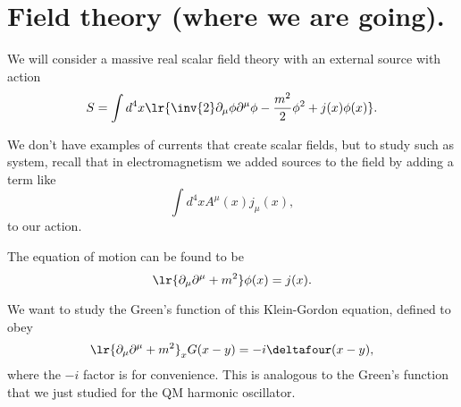 \section{Field theory (where we are going).}

We will consider a massive real scalar field theory with an external source with action
\begin{equation}\label{eqn:qftLecture11:680}
S = \int d^4 x \lr{
\inv{2} \partial_\mu \phi \partial^\mu \phi - \frac{m^2}{2} \phi^2 + j(x) \phi(x)
}.
\end{equation}

We don't have examples of currents that create scalar fields, but to study such as system, recall that
in electromagnetism we added sources to the field by adding a term like
\begin{equation}\label{eqn:qftLecture11:700}
\int d^4 x A^\mu(x) j_\mu(x),
\end{equation}
to our action.

The equation of motion can be found to be
\begin{equation}\label{eqn:qftLecture11:720}
\lr{ \partial_\mu \partial^\mu + m^2 } \phi(x) = j(x).
\end{equation}

We want to study the Green's function of this Klein-Gordon equation, defined to obey
\begin{equation}\label{eqn:qftLecture11:740}
\lr{ \partial_\mu \partial^\mu + m^2 }_x G(x - y) = -i \deltafour(x - y),
\end{equation}
where the \( -i \) factor is for convenience.
This is analogous to the Green's function that we just studied for the QM harmonic oscillator.



